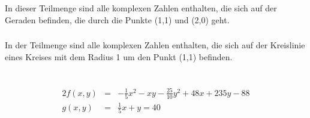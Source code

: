 \documentclass[10pt,a4paper,oneside,ngerman,numbers=noenddot]{scrartcl}
\begin{document}
\subsubsection{} %
In dieser Teilmenge sind alle komplexen Zahlen enthalten, die sich auf der Geraden befinden, die durch die Punkte (1,1) und (2,0) geht.
\subsubsection{} %
In der Teilmenge sind alle komplexen Zahlen enthalten, die sich auf der Kreislinie eines Kreises mit dem Radius 1 um den Punkt (1,1) befinden.
\section{} %
\begin{alignat*}{2}
f(x,y) &=& -\frac{1}{5}x^{2} - xy - \frac{25}{10}y^{2} + 48x + 235y - 88 \\
g(x,y) &=& \frac{1}{5}x + y = 40
\end{alignat*}
\end{document}
